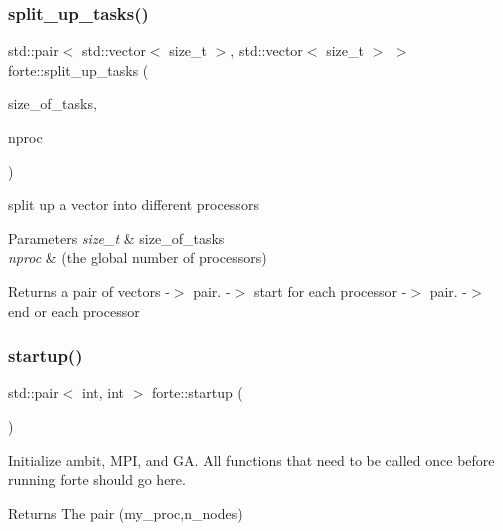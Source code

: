 \mbox{\label{namespaceforte_ad2a6c9cd252f173af61e29e73d0e9194}} 
\subsubsection{\texorpdfstring{split\+\_\+up\+\_\+tasks()}{split\_up\_tasks()}}
{\footnotesize\ttfamily std\+::pair$<$ std\+::vector$<$ size\+\_\+t $>$, std\+::vector$<$ size\+\_\+t $>$ $>$ forte\+::split\+\_\+up\+\_\+tasks (\begin{DoxyParamCaption}\item[{size\+\_\+t}]{size\+\_\+of\+\_\+tasks,  }\item[{size\+\_\+t}]{nproc }\end{DoxyParamCaption})}



split up a vector into different processors 


\begin{DoxyParams}{Parameters}
{\em size\+\_\+t} & size\+\_\+of\+\_\+tasks \\
\hline
{\em nproc} & (the global number of processors) \\
\hline
\end{DoxyParams}
\begin{DoxyReturn}{Returns}
a pair of vectors -\/$>$ pair. -\/$>$ start for each processor -\/$>$ pair. -\/$>$ end or each processor 
\end{DoxyReturn}
\mbox{\label{namespaceforte_ae163b241b552cdfa999f49c3c21ae7f8}} 
\subsubsection{\texorpdfstring{startup()}{startup()}}
{\footnotesize\ttfamily std\+::pair$<$ int, int $>$ forte\+::startup (\begin{DoxyParamCaption}{ }\end{DoxyParamCaption})}



Initialize ambit, M\+PI, and GA. All functions that need to be called once before running forte should go here. 

\begin{DoxyReturn}{Returns}
The pair (my\+\_\+proc,n\+\_\+nodes) 
\end{DoxyReturn}
\mbox{\label{namespaceforte_af0f9481a38ad3ccb1dd258bdfea20492}} 
